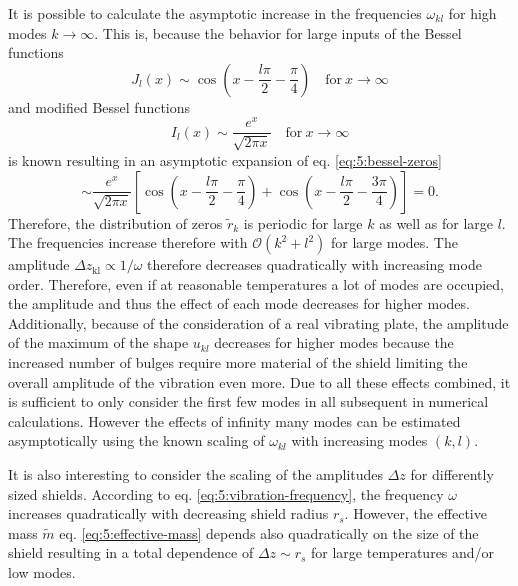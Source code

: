 It is possible to calculate the asymptotic increase in the frequencies $\omega_{kl}$ for high modes $k \rightarrow \infty$.
This is, because the behavior for large inputs of the Bessel functions \cite[eq. 10.17.3]{DLMF}
\begin{equation}
  J_l(x) \sim \cos(x - \frac{l \pi}{2} - \frac{\pi}{4}) \quad \text{for} \ x \rightarrow \infty
\end{equation}
and modified Bessel functions \cite[eq. 10.40.1]{DLMF}
\begin{equation}
  I_l(x) \sim \frac{e^x}{\sqrt{2\pi x}} \quad \text{for} \ x \rightarrow \infty
\end{equation}
is known resulting in an asymptotic expansion of eq. \eqref{eq:5:bessel-zeros} 
\begin{equation}
  \sim \frac{e^x}{\sqrt{2\pi x}} \left[\cos(x - \frac{l \pi}{2} - \frac{\pi}{4}) + \cos(x - \frac{l \pi}{2} - \frac{3 \pi}{4})\right] = 0 .
\end{equation}
Therefore, the distribution of zeros $\tilde{r}_k$ is periodic for large $k$ as well as for large $l$.
The frequencies increase therefore with $\mathcal{O}(k^2 + l^2)$ for large modes.
The amplitude $\Delta z_\mathrm{kl} \propto 1/\omega$ therefore decreases quadratically with increasing mode order.
Therefore, even if at reasonable temperatures a lot of modes are occupied, the amplitude and thus the effect of each mode decreases for higher modes.
Additionally, because of the consideration of a real vibrating plate, the amplitude of the maximum of the shape $u_{kl}$ decreases for higher modes because the increased number of bulges require more material of the shield limiting the overall amplitude of the vibration even more.
Due to all these effects combined, it is sufficient to only consider the first few modes in all subsequent in numerical calculations.
However the effects of infinity many modes can be estimated asymptotically using the known scaling of $\omega_{kl}$ with increasing modes $(k,l)$.

It is also interesting to consider the scaling of the amplitudes $\Delta z$ for differently sized shields. 
According to eq. \eqref{eq:5:vibration-frequency}, the frequency $\omega$ increases quadratically with decreasing shield radius $r_s$.
However, the effective mass $\tilde{m}$ eq. \eqref{eq:5:effective-mass} depends also quadratically on the size of the shield resulting in a total dependence of $\Delta z \sim r_s$ for large temperatures and/or low modes.



